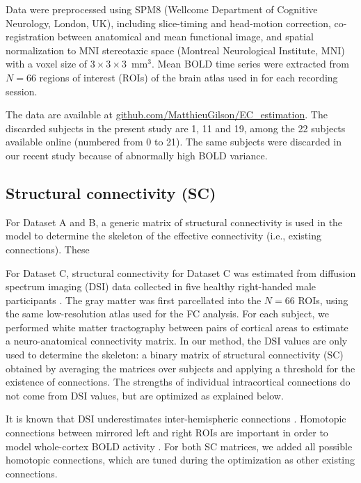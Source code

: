 \documentclass{article}
\begin{document}
Data were preprocessed using SPM8 (Wellcome Department of Cognitive Neurology, London, UK), including slice-timing and head-motion correction, co-registration between anatomical and mean functional image, and spatial normalization to MNI stereotaxic space (Montreal Neurological Institute, MNI) with a voxel size of $3 \times 3 \times 3$~mm$^3$. 
Mean BOLD time series were extracted from $N = 66$ regions of interest (ROIs) of the brain atlas used in \cite{Hagmann_PB_2008} for each recording session. 

The data are available at \url{github.com/MatthieuGilson/EC_estimation}.
The discarded subjects in the present study are 1, 11 and 19, among the 22 subjects available online (numbered from 0 to 21). The same subjects were discarded in our recent study \cite{Gilson_NeIm_2017} because of abnormally high BOLD variance.


\subsection{Structural connectivity (SC)}

For Dataset A and B, a generic matrix of structural connectivity is used in the model to determine the skeleton of the effective connectivity (i.e., existing connections). These 

For Dataset C, structural connectivity for Dataset C was estimated from diffusion spectrum imaging (DSI) data collected in five healthy right-handed male participants \cite{Hagmann_PB_2008}. The gray matter was first parcellated into the $N = 66$ ROIs, using the same low-resolution atlas used for the FC analysis. For each subject, we performed white matter tractography between pairs of cortical areas to estimate a neuro-anatomical connectivity matrix. In our method, the DSI values are only used to determine the skeleton: a binary matrix of structural connectivity (SC) obtained by averaging the matrices over subjects and applying a threshold for the existence of connections. The strengths of individual intracortical connections do not come from DSI values, but are optimized as explained below.

It is known that DSI underestimates inter-hemispheric connections \cite{Hagmann_PB_2008}. Homotopic connections between mirrored left and right ROIs are important in order to model whole-cortex BOLD activity \cite{Messe_PCB_2014}. For both SC matrices, we added all possible homotopic connections, which are tuned during the optimization as other existing connections. 
\end{document}
